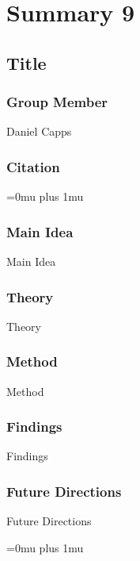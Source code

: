 \section{Summary 9}

\noindent
\subsection{Title}

\subsubsection{Group Member}

\noindent
Daniel Capps

\noindent
\subsubsection{Citation}

\Urlmuskip=0mu plus 1mu\relax

\subsubsection{Main Idea}

\noindent
Main Idea

\subsubsection{Theory}

\noindent
Theory

\subsubsection{Method}

\noindent
Method

\subsubsection{Findings}

\noindent
Findings

\subsubsection{Future Directions}

\noindent
Future Directions 

\Urlmuskip=0mu plus 1mu\relax

